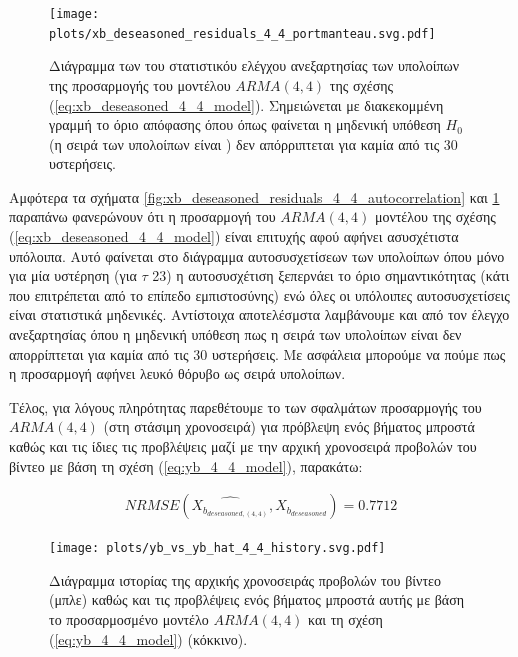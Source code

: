\begin{figure}[H]
    \begin{center}
        \texttt{[image: plots/xb\_deseasoned\_residuals\_4\_4\_portmanteau.svg.pdf]}
        \caption{Διάγραμμα των  του στατιστικόυ ελέγχου ανεξαρτησίας  των υπολοίπων της προσαρμογής του μοντέλου $ARMA(4,4)$ της σχέσης (\ref{eq:xb_deseasoned_4_4_model}). Σημειώνεται με διακεκομμένη γραμμή το όριο απόφασης όπου όπως φαίνεται η μηδενική υπόθεση $H_0$ (η σειρά των υπολοίπων είναι ) δεν απόρριπτεται για καμία από τις 30 υστερήσεις.}
        \label{fig:xb_deseasoned_residuals_4_4_portmanteau}
    \end{center}
\end{figure}

Αμφότερα τα σχήματα \ref{fig:xb_deseasoned_residuals_4_4_autocorrelation} και \ref{fig:xb_deseasoned_residuals_4_4_portmanteau} παραπάνω φανερώνουν ότι η προσαρμογή του $ARMA(4,4)$ μοντέλου της σχέσης (\ref{eq:xb_deseasoned_4_4_model}) είναι επιτυχής αφού αφήνει ασυσχέτιστα υπόλοιπα. Αυτό φαίνεται στο διάγραμμα αυτοσυσχετίσεων των υπολοίπων όπου μόνο για μία υστέρηση (για $\tau$ 23) η αυτοσυσχέτιση ξεπερνάει το όριο σημαντικότητας (κάτι που επιτρέπεται από το επίπεδο εμπιστοσύνης) ενώ όλες οι υπόλοιπες αυτοσυσχετίσεις είναι στατιστικά μηδενικές. Αντίστοιχα αποτελέσμστα λαμβάνουμε και από τον έλεγχο ανεξαρτησίας  όπου η μηδενική υπόθεση πως η σειρά των υπολοίπων είναι  δεν απορρίπτεται για καμία από τις 30 υστερήσεις. Με ασφάλεια μπορούμε να πούμε πως η προσαρμογή αφήνει λευκό θόρυβο ως σειρά υπολοίπων.

\par Τέλος, για λόγους πληρότητας παρεθέτουμε το  των σφαλμάτων προσαρμογής του $ARMA(4,4)$ (στη στάσιμη χρονοσειρά) για πρόβλεψη ενός βήματος μπροστά καθώς και τις ίδιες τις προβλέψεις μαζί με την αρχική χρονοσειρά προβολών του βίντεο  με βάση τη σχέση (\ref{eq:yb_4_4_model}), παρακάτω:

\begin{align}
NRMSE(\hat{X_{b_{deseasoned,(4,4)}}}, X_{b_{deseasoned}}) = 0.7712
\end{align}

\begin{figure}[H]
    \begin{center}
        \texttt{[image: plots/yb\_vs\_yb\_hat\_4\_4\_history.svg.pdf]}
        \caption{Διάγραμμα ιστορίας της αρχικής χρονοσειράς προβολών του βίντεο  (μπλε) καθώς και τις προβλέψεις ενός βήματος μπροστά αυτής με βάση το προσαρμοσμένο μοντέλο $ARMA(4,4)$ και τη σχέση (\ref{eq:yb_4_4_model}) (κόκκινο).}
        \label{fig:yb_vs_yb_hat_4_4_history}
    \end{center}
\end{figure}

